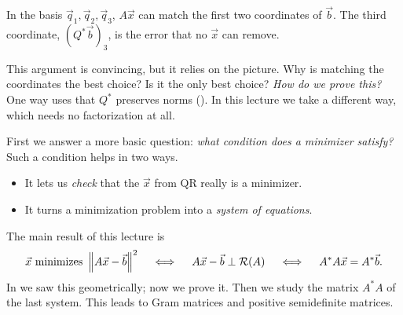 \begin{center}

\small In the basis $\vec{q}_1, \vec{q}_2, \vec{q}_3$, $A\vec{x}$ can match the first two coordinates of $\vec{b}$. The third coordinate, $(Q^\ast\vec{b})_3$, is the error that no $\vec{x}$ can remove.
\end{center}

This argument is convincing, but it relies on the picture. Why is matching the coordinates the best choice? Is it the only best choice? \emph{How do we prove this?} One way uses that $Q^\ast$ preserves norms (). In this lecture we take a different way, which needs no factorization at all.

First we answer a more basic question: \emph{what condition does a minimizer satisfy?} Such a condition helps in two ways.
\begin{itemize}
  \item It lets us \emph{check} that the $\vec{x}$ from QR really is a minimizer.
  \item It turns a minimization problem into a \emph{system of equations}.
\end{itemize}
The main result of this lecture is
\begin{equation}
  \vec{x} \text{ minimizes } \left\lVert A\vec{x} - \vec{b} \right\rVert^2 \quad\iff\quad A\vec{x} - \vec{b} \perp \mathcal{R}(A) \quad\iff\quad A^\ast A\vec{x} = A^\ast\vec{b}.
\end{equation}
In  we saw this geometrically; now we prove it. Then we study the matrix $A^\ast A$ of the last system. This leads to Gram matrices and positive semidefinite matrices.

